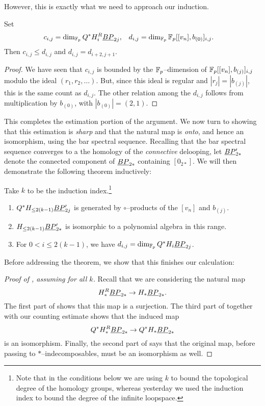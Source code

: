 \noindent However, this is exactly what we need to approach our induction.

\begin{lemma}
Set
\begin{align*}
c_{i,j} & = \dim_{\mathbb F_p} Q^* H_i^R \underline{\smash{BP}}_{2j}, &
d_{i,j} & = \dim_{\mathbb F_p} \mathbb F_p[[v_n], b_{(0)}]_{i,j}.
\end{align*}
Then $c_{i,j} \le d_{i,j}$ and $d_{i,j} = d_{i+2,j+1}$.
\end{lemma}
\begin{proof}
We have seen that $c_{i,j}$ is bounded by the $\mathbb F_p$--dimension of $\mathbb F_p[[v_n], b_{(j)}]_{i,j}$ modulo the ideal $(r_1, r_2, \ldots)$.  But, since this ideal is regular and $|r_j| = |b_{(j)}|$, this is the same count as $d_{i,j}$.  The other relation among the $d_{i,j}$ follows from multiplication by $b_{(0)}$, with $|b_{(0)}| = (2, 1)$.
\end{proof}

This completes the estimation portion of the argument.  We now turn to showing that this estimation is \emph{sharp} and that the natural map is \emph{onto}, and hence an isomorphism, using the bar spectral sequence.  Recalling that the bar spectral sequence converges to a the homology of the \emph{connective} delooping, let $\underline{\smash{BP}}_{2*}'$ denote the connected component of $\underline{\smash{BP}}_{2*}$ containing $[0_{2*}]$.  We will then demonstrate the following theorem inductively:
\begin{theorem}\label{HFpBPCooperationsInduction}
Take $k$ to be the induction index.\footnote{Note that in the conditions below we are using $k$ to bound the topological degree of the homology groups, whereas yesterday we used the induction index to bound the degree of the infinite loopspace.}
\begin{enumerate}
\item $Q^* H_{\le 2(k-1)} \underline{\smash{BP}}_{2j}'$ is generated by $\circ$--products of the $[v_n]$ and $b_{(j)}$.
\item $H_{\le 2(k-1)} \underline{\smash{BP}}_{2*}'$ is isomorphic to a polynomial algebra in this range.
\item For $0 < i \le 2(k-1)$, we have $d_{i,j} = \dim_{\mathbb F_p} Q^* H_i \underline{\smash{BP}}_{2j}$.
\end{enumerate}
\end{theorem}

Before addressing the theorem, we show that this finishes our calculation:
\begin{proof}[{Proof of , assuming  for all $k$}]
Recall that we are considering the natural map \[H_*^R \underline{\smash{BP}}_{2*} \to H_* \underline{\smash{BP}}_{2*}.\]  The first part of  shows that this map is a surjection.  The third part of  together with our counting estimate shows that the induced map \[Q^* H_*^R \underline{\smash{BP}}_{2*} \to Q^* H_* \underline{\smash{BP}}_{2*}\] is an isomorphism.  Finally, the second part of  says that the original map, before passing to $\ast$--indecomposables, must be an isomorphism as well.
\end{proof}

